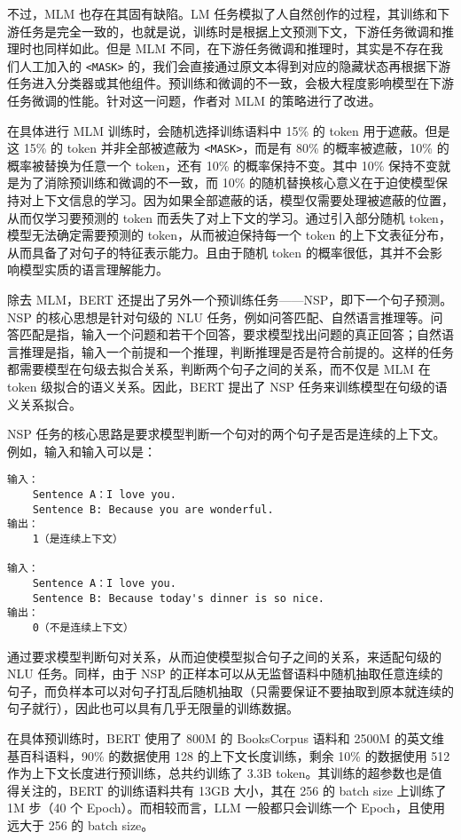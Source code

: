\documentclass[12pt,a4paper]{book}
\begin{document}
不过，MLM 也存在其固有缺陷。LM
任务模拟了人自然创作的过程，其训练和下游任务是完全一致的，也就是说，训练时是根据上文预测下文，下游任务微调和推理时也同样如此。但是
MLM 不同，在下游任务微调和推理时，其实是不存在我们人工加入的
\texttt{\textless{}MASK\textgreater{}}
的，我们会直接通过原文本得到对应的隐藏状态再根据下游任务进入分类器或其他组件。预训练和微调的不一致，会极大程度影响模型在下游任务微调的性能。针对这一问题，作者对
MLM 的策略进行了改进。

在具体进行 MLM 训练时，会随机选择训练语料中 15\% 的 token
用于遮蔽。但是这 15\% 的 token 并非全部被遮蔽为
\texttt{\textless{}MASK\textgreater{}}，而是有 80\% 的概率被遮蔽，10\%
的概率被替换为任意一个 token，还有 10\% 的概率保持不变。其中 10\%
保持不变就是为了消除预训练和微调的不一致，而 10\%
的随机替换核心意义在于迫使模型保持对上下文信息的学习。因为如果全部遮蔽的话，模型仅需要处理被遮蔽的位置，从而仅学习要预测的
token 而丢失了对上下文的学习。通过引入部分随机
token，模型无法确定需要预测的 token，从而被迫保持每一个 token
的上下文表征分布，从而具备了对句子的特征表示能力。且由于随机 token
的概率很低，其并不会影响模型实质的语言理解能力。

除去 MLM，BERT
还提出了另外一个预训练任务------NSP，即下一个句子预测。NSP
的核心思想是针对句级的 NLU
任务，例如问答匹配、自然语言推理等。问答匹配是指，输入一个问题和若干个回答，要求模型找出问题的真正回答；自然语言推理是指，输入一个前提和一个推理，判断推理是否是符合前提的。这样的任务都需要模型在句级去拟合关系，判断两个句子之间的关系，而不仅是
MLM 在 token 级拟合的语义关系。因此，BERT 提出了 NSP
任务来训练模型在句级的语义关系拟合。

NSP
任务的核心思路是要求模型判断一个句对的两个句子是否是连续的上下文。例如，输入和输入可以是：

\begin{verbatim}
输入：
    Sentence A：I love you.
    Sentence B: Because you are wonderful.
输出：
    1（是连续上下文）

输入：
    Sentence A：I love you.
    Sentence B: Because today's dinner is so nice.
输出：
    0（不是连续上下文）
\end{verbatim}

通过要求模型判断句对关系，从而迫使模型拟合句子之间的关系，来适配句级的
NLU 任务。同样，由于 NSP
的正样本可以从无监督语料中随机抽取任意连续的句子，而负样本可以对句子打乱后随机抽取（只需要保证不要抽取到原本就连续的句子就行），因此也可以具有几乎无限量的训练数据。

在具体预训练时，BERT 使用了 800M 的 BooksCorpus 语料和 2500M
的英文维基百科语料，90\% 的数据使用 128 的上下文长度训练，剩余 10\%
的数据使用 512 作为上下文长度进行预训练，总共约训练了 3.3B
token。其训练的超参数也是值得关注的，BERT 的训练语料共有 13GB 大小，其在
256 的 batch size 上训练了 1M 步（40 个 Epoch）。而相较而言，LLM
一般都只会训练一个 Epoch，且使用远大于 256 的 batch size。
\end{document}
